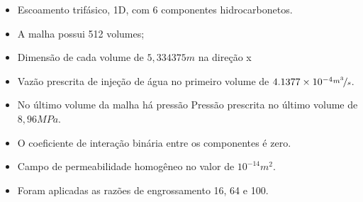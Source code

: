 \documentclass[professionalfont]{beamer}
\begin{document}
\begin{frame}{\FrameProblemName}

    \begin{itemize}
        \item Escoamento trifásico, 1D, com 6 componentes hidrocarbonetos. 
        \item A malha possui 512 volumes;
        \item Dimensão de cada volume de $5,334375 m$ na direção x
        \item Vazão prescrita de injeção de água no primeiro volume de $4.1377 \times 10^{-4} \nicefrac{m^{3}}{s}$. 
        \item No último volume da malha há pressão Pressão prescrita no último volume de $8, 96MPa$. 
        \item O coeficiente de interação binária entre os componentes é zero.
        \item  Campo de permeabilidade homogêneo no valor de $10^{-14} m^{2}$.
        \item Foram aplicadas as razões de engrossamento 16, 64 e 100. 
    \end{itemize}
    
\end{frame}
\end{document}
